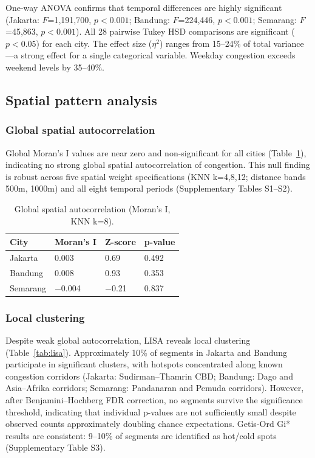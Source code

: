 \documentclass[preprint,12pt,authoryear]{elsarticle}
\begin{document}
One-way ANOVA confirms that temporal differences are highly significant (Jakarta: $F$=1,191,700, $p<0.001$; Bandung: $F$=224,446, $p<0.001$; Semarang: $F$=45,863, $p<0.001$). All 28 pairwise Tukey HSD comparisons are significant ($p<0.05$) for each city. The effect size ($\eta^2$) ranges from 15--24\% of total variance---a strong effect for a single categorical variable. Weekday congestion exceeds weekend levels by 35--40\%.

\subsection{Spatial pattern analysis}

\subsubsection{Global spatial autocorrelation}

Global Moran's I values are near zero and non-significant for all cities (Table~\ref{tab:moransI}), indicating no strong global spatial autocorrelation of congestion. This null finding is robust across five spatial weight specifications (KNN k=4,8,12; distance bands 500m, 1000m) and all eight temporal periods (Supplementary Tables S1--S2).

\begin{table}[htbp]
\centering
\caption{Global spatial autocorrelation (Moran's I, KNN k=8).}
\label{tab:moransI}
\begin{tabular}{llll}
\toprule
City & Moran's I & Z-score & p-value \\
\midrule
Jakarta  & 0.003  & 0.69  & 0.492 \\
Bandung  & 0.008  & 0.93  & 0.353 \\
Semarang & $-$0.004 & $-$0.21 & 0.837 \\
\bottomrule
\end{tabular}
\end{table}

\subsubsection{Local clustering}

Despite weak global autocorrelation, LISA reveals local clustering (Table~\ref{tab:lisa}). Approximately 10\% of segments in Jakarta and Bandung participate in significant clusters, with hotspots concentrated along known congestion corridors (Jakarta: Sudirman--Thamrin CBD; Bandung: Dago and Asia--Afrika corridors; Semarang: Pandanaran and Pemuda corridors). However, after Benjamini--Hochberg FDR correction, no segments survive the significance threshold, indicating that individual p-values are not sufficiently small despite observed counts approximately doubling chance expectations. Getis-Ord Gi* results are consistent: 9--10\% of segments are identified as hot/cold spots (Supplementary Table S3).
\end{document}
